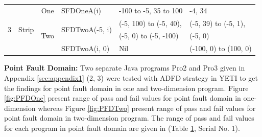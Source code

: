 \begin{table}[h]
{\begin{tabular}{|c|c|c|l|l|l|}
\multirow{5}{*}{3} 	&	\multirow{5}{*}{Strip}					& 	\multirow{2}{*}{One}			&	\multirow{2}{*}{SFDOneA(i)}	&	\multirow{2}{*}{-100 to -5, 35 to 100}		& 	\multirow{2}{*}{-4, 34	}\\ 
				&									&							&							&									&				\\  \cline{3-6}
				&									&	\multirow{3}{*}{Two}			&	\multirow{2}{*}{SFDTwoA(-5, i)}	&	(-5, 100) to (-5, 40),					&  (-5, 39) to (-5, 1), 			\\ 
				&									&							&							&	 (-5, 0) to (-5, -100)					&	(-5, 0)				\\ \cline{4-6}
				&									& 							&	SFDTwoA(i, 0)				&	Nil								&  (-100, 0) to (100, 0)			\\  \hline
				
				
\end{tabular}
}
\label{table:failtable}
\end{table}




\noindent \textbf{Point Fault Domain:}  Two separate Java programs Pro2 and Pro3 given in Appendix \ref{sec:appendix1} (2, 3) were tested with ADFD strategy in YETI to get the findings for point fault domain in one and two-dimension program. Figure \ref{fig:PFDOne} present range of pass and fail values for point fault domain in one-dimension whereas Figure \ref{fig:PFDTwo} present range of pass and fail values for point fault domain in two-dimension program. The range of pass and fail values for each program in point fault domain are given in (Table \ref{table:failtable}, Serial No. 1).

